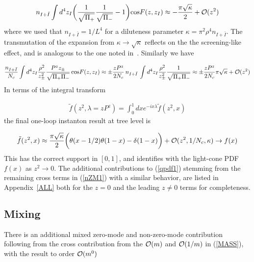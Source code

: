 \documentclass[11pt,aps,amsmath,amssymb,nofootinbib,notitlepage,longbibliography]{revtex4-1}
\newcommand{\be}{\begin{equation}}
\newcommand{\ee}{\end{equation}}
\begin{document}
\be
{{n_{I+\bar I}}}\int d^4z_I \bigg(\frac 1{\sqrt{\Pi_+}}\frac 1{\sqrt{\Pi_-}}-1\bigg){\rm cos}{F(z,z_I)}\approx -\frac{\pi\sqrt\kappa}2
+{\cal O}(z^2)
\ee
where we used that  $n_{I+\bar I}=1/L^4$ for  a diluteness parameter $\kappa=\pi^2\rho^4n_{I+\bar I}$.
The transmutation of the expansion from $\kappa\rightarrow \sqrt{\kappa}$ reflects on the the screening-like
effect,  and is analogous to the one noted in~\cite{Kock:2020frx}. Similarly we have

\be
\frac{n_{I+\bar I}}{N_c}\int d^4z_I \frac{\rho^2}{z_\pm^2}\frac {P^zz_{\pm }}{\sqrt{\Pi_+\Pi_-}}\,{\rm cos}{F(z,z_I)}\approx
\pm \frac {zP^z}{2N_c} \,{n_{I+\bar I}}\,\int d^4z_I \frac{\rho^2}{z_\pm^2}\frac 1{\sqrt{\Pi_+\Pi_-}}
\approx   \pm \frac {zP^z}{2N_c} \pi\sqrt{\kappa}+{\cal O}(z^2)
\ee
In terms of  the integral  transform

\begin{align}
\tilde f(z^2,\lambda=zP^z)=\int_{0}^1 dx e^{-ix \lambda }\tilde f(z^2,x)
\end{align}
the final one-loop instanton result at tree level is

\begin{align}
\tilde f(z^2,x)\approx\frac{\pi\sqrt\kappa}2\bigg(
\theta(x-1/2)\theta(1-x) -\delta(1-x)\bigg)+{\cal O}(z^2, 1/N_c, \kappa)\rightarrow  f(x)
\end{align}
This has the correct support in $[0,1]$,  and identifies with the light-cone
PDF $f(x)$ as $z^2\rightarrow 0$. The additional contributions to (\ref{qpdf1}) stemming from
the remaining cross terms in (\ref{nZM1}) with a similar behavior, are listed in Appendix~\ref{ALL} both
for the $z=0$ and the leading $z\neq 0$ terms for completeness.



\subsection{Mixing}


There is an additional mixed zero-mode and non-zero-mode contribution
following from the cross contribution from the  ${\cal O}(m)$ and ${\cal O}(1/m)$ in (\ref{MASS}), with the result
to order ${\cal O}(m^0)$
\end{document}
